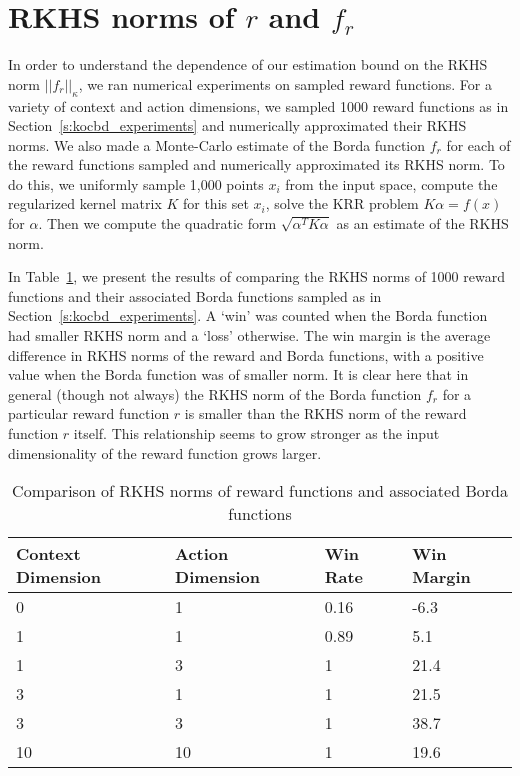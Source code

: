 \documentclass{article} \usepackage{iclr2023_conference,times}
\newcommand{\kernel}{\kappa}
\newcommand{\borda}{f_r}
\begin{document}
\section{RKHS norms of $r$ and $\borda$}
\label{s:rkhs_borda}
In order to understand the dependence of our estimation bound on the RKHS norm $||\borda||_{\kernel}$, we ran numerical experiments on sampled reward functions. For a variety of context and action dimensions, we sampled 1000 reward functions as in Section~\ref{s:kocbd_experiments} and numerically approximated their RKHS norms. We also made a Monte-Carlo estimate of the Borda function $f_r$ for each of the reward functions sampled and numerically approximated its RKHS norm.
To do this, we uniformly sample 1,000 points $x_i$ from the input space, compute the regularized kernel matrix $K$ for this set $x_i$, solve the KRR problem $K \alpha = f(x)$ for $\alpha$. Then we compute the quadratic form $\sqrt{\alpha^T K\alpha}$ as an estimate of the RKHS norm.

In Table~\ref{tab:borda_norm}, we present the results of comparing the RKHS norms of 1000 reward functions and their associated Borda functions sampled as in Section~\ref{s:kocbd_experiments}. A `win' was counted when the Borda function had smaller RKHS norm and a `loss' otherwise. The win margin is the average difference in RKHS norms of the reward and Borda functions, with a positive value when the Borda function was of smaller norm.
It is clear here that in
general (though not always) the RKHS norm of the Borda function $\borda$ for a particular reward function $r$ is smaller than the RKHS norm of the reward function $r$ itself. This relationship seems to grow stronger as the input dimensionality of the reward function grows larger.

\begin{table}[]
\centering
\begin{tabular}{@{}llll@{}}
\toprule
Context Dimension & Action Dimension & Win Rate & Win Margin\\ \midrule
0 & 1 & 0.16 & -6.3 \\
1 & 1 & 0.89 & 5.1 \\
1 & 3 & 1 & 21.4 \\
3 & 1 & 1 & 21.5 \\
3 & 3 & 1 & 38.7 \\
10 & 10 & 1 & 19.6 \\
\bottomrule
\end{tabular}
\caption{Comparison of RKHS norms of reward functions and associated Borda functions}
\label{tab:borda_norm}
\end{table}
\end{document}
